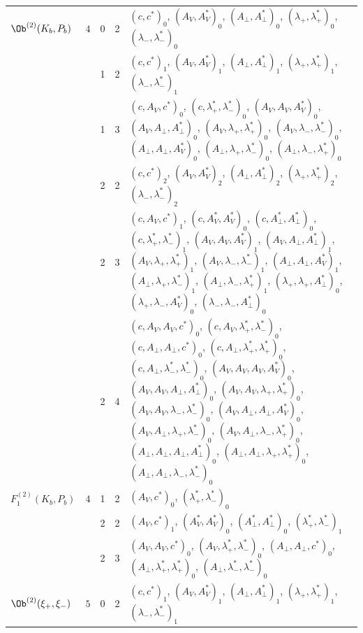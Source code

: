 {\begin{longtable}{>{\raggedright}p{2.3cm}|p{0.6cm}|p{0.25cm}|p{0.25cm}|>{\raggedright\arraybackslash}p{11.6cm}}
\hline
$\Ob^{(2)}(K_b,P_b)$ & $4$ & 0 & 2 & $(c,c^*)_{0}$, $(A_V,A^*_V)_{0}$, $(A_\perp,A^*_\perp)_{0}$, $(\lambda_+,\lambda^*_+)_{0}$, $(\lambda_-,\lambda^*_-)_{0}$ \\
 &  & 1 & 2 & $(c,c^*)_{1}$, $(A_V,A^*_V)_{1}$, $(A_\perp,A^*_\perp)_{1}$, $(\lambda_+,\lambda^*_+)_{1}$, $(\lambda_-,\lambda^*_-)_{1}$ \\
 &  & 1 & 3 & $(c,A_V,c^*)_{0}$, $(c,\lambda^*_+,\lambda^*_-)_{0}$, $(A_V,A_V,A^*_V)_{0}$, $(A_V,A_\perp,A^*_\perp)_{0}$, $(A_V,\lambda_+,\lambda^*_+)_{0}$, $(A_V,\lambda_-,\lambda^*_-)_{0}$, $(A_\perp,A_\perp,A^*_V)_{0}$, $(A_\perp,\lambda_+,\lambda^*_-)_{0}$, $(A_\perp,\lambda_-,\lambda^*_+)_{0}$ \\
 &  & 2 & 2 & $(c,c^*)_{2}$, $(A_V,A^*_V)_{2}$, $(A_\perp,A^*_\perp)_{2}$, $(\lambda_+,\lambda^*_+)_{2}$, $(\lambda_-,\lambda^*_-)_{2}$ \\
 &  & 2 & 3 & $(c,A_V,c^*)_{1}$, $(c,A^*_V,A^*_V)_{0}$, $(c,A^*_\perp,A^*_\perp)_{0}$, $(c,\lambda^*_+,\lambda^*_-)_{1}$, $(A_V,A_V,A^*_V)_{1}$, $(A_V,A_\perp,A^*_\perp)_{1}$, $(A_V,\lambda_+,\lambda^*_+)_{1}$, $(A_V,\lambda_-,\lambda^*_-)_{1}$, $(A_\perp,A_\perp,A^*_V)_{1}$, $(A_\perp,\lambda_+,\lambda^*_-)_{1}$, $(A_\perp,\lambda_-,\lambda^*_+)_{1}$, $(\lambda_+,\lambda_+,A^*_\perp)_{0}$, $(\lambda_+,\lambda_-,A^*_V)_{0}$, $(\lambda_-,\lambda_-,A^*_\perp)_{0}$ \\
 &  & 2 & 4 & $(c,A_V,A_V,c^*)_{0}$, $(c,A_V,\lambda^*_+,\lambda^*_-)_{0}$, $(c,A_\perp,A_\perp,c^*)_{0}$, $(c,A_\perp,\lambda^*_+,\lambda^*_+)_{0}$, $(c,A_\perp,\lambda^*_-,\lambda^*_-)_{0}$, $(A_V,A_V,A_V,A^*_V)_{0}$, $(A_V,A_V,A_\perp,A^*_\perp)_{0}$, $(A_V,A_V,\lambda_+,\lambda^*_+)_{0}$, $(A_V,A_V,\lambda_-,\lambda^*_-)_{0}$, $(A_V,A_\perp,A_\perp,A^*_V)_{0}$, $(A_V,A_\perp,\lambda_+,\lambda^*_-)_{0}$, $(A_V,A_\perp,\lambda_-,\lambda^*_+)_{0}$, $(A_\perp,A_\perp,A_\perp,A^*_\perp)_{0}$, $(A_\perp,A_\perp,\lambda_+,\lambda^*_+)_{0}$, $(A_\perp,A_\perp,\lambda_-,\lambda^*_-)_{0}$ \\
\hline
$F_1^{(2)}(K_b,P_b)$ & $4$ & 1 & 2 & $(A_V,c^*)_{0}$, $(\lambda^*_+,\lambda^*_-)_{0}$ \\
 &  & 2 & 2 & $(A_V,c^*)_{1}$, $(A^*_V,A^*_V)_{0}$, $(A^*_\perp,A^*_\perp)_{0}$, $(\lambda^*_+,\lambda^*_-)_{1}$ \\
 &  & 2 & 3 & $(A_V,A_V,c^*)_{0}$, $(A_V,\lambda^*_+,\lambda^*_-)_{0}$, $(A_\perp,A_\perp,c^*)_{0}$, $(A_\perp,\lambda^*_+,\lambda^*_+)_{0}$, $(A_\perp,\lambda^*_-,\lambda^*_-)_{0}$ \\
\hline
$\Ob^{(2)}(\xi_+,\xi_-)$ & $5$ & 0 & 2 & $(c,c^*)_{1}$, $(A_V,A^*_V)_{1}$, $(A_\perp,A^*_\perp)_{1}$, $(\lambda_+,\lambda^*_+)_{1}$, $(\lambda_-,\lambda^*_-)_{1}$ \\

\end{longtable}}
